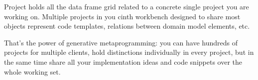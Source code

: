 \label{project}


Project holds all the data frame grid related to a concrete single project you
are working on. Multiple projects in you cinth workbench designed to share most
objects represent code templates, relations between domain model elements, etc.

That's the power of generative metaprogramming: you can have hundreds of
projects for multiple clients, hold distinctions individually in every project,
but in the same time share all your implementation ideas and code snippets over
the whole working set.